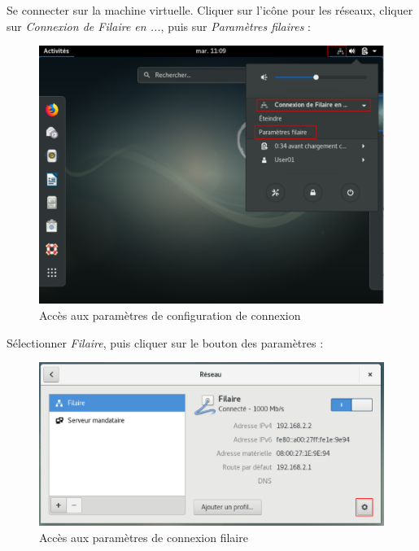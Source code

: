 \pagebreak
Se connecter sur la machine virtuelle. Cliquer sur l'icône pour les réseaux, cliquer sur \textit{Connexion de Filaire en ...}, puis sur \textit{Paramètres filaires} :
  \begin{figure}[h!]
     \begin{center}
         \includegraphics[scale=0.5]{Debian_screenshots/Config/3.png}
         \caption{Accès aux paramètres de configuration de connexion}
         \label{Debian_screenshots/Config/3}
     \end{center}
  \end{figure}
  \FloatBarrier
     
Sélectionner \textit{Filaire}, puis cliquer sur le bouton des paramètres :
  \begin{figure}[h!]
     \begin{center}
         \includegraphics[scale=0.5]{Debian_screenshots/Config/4.png}
         \caption{Accès aux paramètres de connexion filaire}
         \label{Debian_screenshots/Config/4}
     \end{center}
  \end{figure}
  \FloatBarrier

